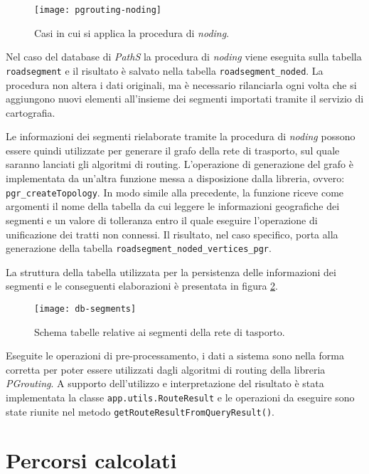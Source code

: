 \begin{figure}[ht]
  \centering
  \texttt{[image: pgrouting-noding]}
  \caption{\footnotesize{Casi in cui si applica la procedura di \emph{noding}.}}
  \label{fig:pgrouting-noding}
\end{figure}

Nel caso del database di \emph{PathS} la procedura di \emph{noding} viene eseguita sulla tabella \texttt{roadsegment} e il risultato è salvato nella tabella \texttt{roadsegment\_noded}. La procedura non altera i dati originali, ma è necessario rilanciarla ogni volta che si aggiungono nuovi elementi all'insieme dei segmenti importati tramite il servizio di cartografia.

Le informazioni dei segmenti rielaborate tramite la procedura di \emph{noding} possono essere quindi utilizzate per generare il grafo della rete di trasporto, sul quale saranno lanciati gli algoritmi di routing. L'operazione di generazione del grafo è implementata da un'altra funzione messa a disposizione dalla libreria, ovvero: \texttt{pgr\_createTopology}. In modo simile alla precedente, la funzione riceve come argomenti il nome della tabella da cui leggere le informazioni geografiche dei segmenti e un valore di tolleranza entro il quale eseguire l'operazione di unificazione dei tratti non connessi. Il risultato, nel caso specifico, porta alla generazione della tabella \texttt{roadsegment\_noded\_vertices\_pgr}. 

La struttura della tabella utilizzata per la persistenza delle informazioni dei segmenti e le conseguenti elaborazioni è presentata in figura \ref{fig:db-segments}.
\begin{figure}[ht]
  \centering
  \texttt{[image: db-segments]}
  \caption{\footnotesize{Schema tabelle relative ai segmenti della rete di tasporto.}}
  \label{fig:db-segments}
\end{figure}

Eseguite le operazioni di pre-processamento, i dati a sistema sono nella forma corretta per poter essere utilizzati dagli algoritmi di routing della libreria \emph{PGrouting}. A supporto dell'utilizzo e interpretazione del risultato è stata implementata la classe \texttt{app.utils.RouteResult} e le operazioni da eseguire sono state riunite nel metodo \texttt{getRouteResultFromQueryResult()}.

\section{Percorsi calcolati}
